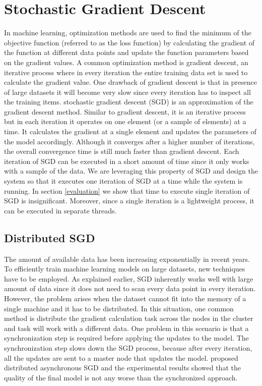 \documentclass{sig-alternate-05-2015}
\begin{document}
\section{Stochastic Gradient Descent} \label{sgd}
In machine learning, optimization methods are used to find the minimum of the objective function (referred to as the loss function) by calculating the gradient of the function at different data points and update the function parameters based on the gradient values.
A common optimization method is gradient descent, an iterative process where in every iteration the entire training data set is used to calculate the gradient value.
One drawback of gradient descent is that in presence of large datasets it will become very slow since every iteration has to inspect all the training items.
stochastic gradient descent (SGD) is an approximation of the gradient descent method. 
Similar to gradient descent, it is an iterative process but in each iteration it operates on one element (or a sample of elements) at a time. 
It calculates the gradient at a single element and updates the parameters of the model accordingly. 
Although it converges after a higher number of iterations, the overall convergence time is still much faster than gradient descent. 
Each iteration of SGD can be executed in a short amount of time since it only works with a sample of the data.
We are leveraging this property of SGD and design the system so that it executes one iteration of SGD at a time while the system is running.
In section \ref{evaluation} we show that time to execute single iteration of SGD is insignificant.
Moreover, since a single iteration is a lightweight process, it can be executed in separate threads.

\subsection{Distributed SGD}
The amount of available data has been increasing exponentially in recent years.
To efficiently train machine learning models on large datasets, new techniques have to be employed.
As explained earlier, SGD inherently works well with large amount of data since it does not need to scan every data point in every iteration.
However, the problem arises when the dataset cannot fit into the memory of a single machine and it has to be distributed.
In this situation, one common method is distribute the gradient calculation task across the nodes in the cluster and task will work with a different data.
One problem in this scenario is that a synchronization step is required before applying the updates to the model. 
The synchronization step slows down the SGD process, because after every iteration, all the updates are sent to a master node that updates the model.
\cite{recht2011hogwild, dean2012large} proposed distributed asynchronous SGD and the experimental results showed that the quality of the final model is not any worse than the synchronized approach. 
\end{document}
